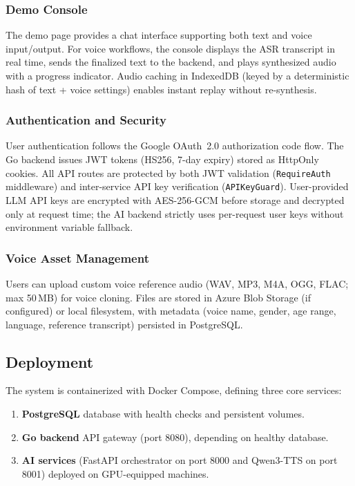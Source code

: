 \documentclass[10pt, a4paper, twocolumn]{article}
\begin{document}
\subsubsection{Demo Console}
The demo page provides a chat interface supporting both text and voice input/output.
For voice workflows, the console displays the ASR transcript in real time, sends the finalized text to the backend, and plays synthesized audio with a progress indicator.
Audio caching in IndexedDB (keyed by a deterministic hash of text + voice settings) enables instant replay without re-synthesis.

\subsubsection{Authentication and Security}
User authentication follows the Google OAuth~2.0 authorization code flow.
The Go backend issues JWT tokens (HS256, 7-day expiry) stored as HttpOnly cookies.
All API routes are protected by both JWT validation (\texttt{RequireAuth} middleware) and inter-service API key verification (\texttt{APIKeyGuard}).
User-provided LLM API keys are encrypted with AES-256-GCM before storage and decrypted only at request time; the AI backend strictly uses per-request user keys without environment variable fallback.

\subsubsection{Voice Asset Management}
Users can upload custom voice reference audio (WAV, MP3, M4A, OGG, FLAC; max 50\,MB) for voice cloning.
Files are stored in Azure Blob Storage (if configured) or local filesystem, with metadata (voice name, gender, age range, language, reference transcript) persisted in PostgreSQL.

\subsection{Deployment}

The system is containerized with Docker Compose, defining three core services:
\begin{enumerate}[label=\arabic*., nosep]
    \item \textbf{PostgreSQL} database with health checks and persistent volumes.
    \item \textbf{Go backend} API gateway (port 8080), depending on healthy database.
    \item \textbf{AI services} (FastAPI orchestrator on port 8000 and Qwen3-TTS on port 8001) deployed on GPU-equipped machines.
\end{enumerate}
\end{document}
